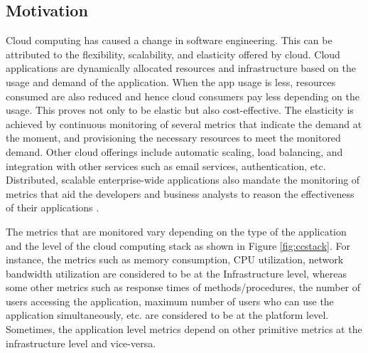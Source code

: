 \documentclass[article,type=msc,colorback,12pt,accentcolor=tud8b,table]{tudthesis}
\begin{document}
	
	\subsection{Motivation}
	
	Cloud computing has caused a change in software engineering. This can be attributed to the flexibility, scalability, and elasticity offered by cloud. Cloud applications are dynamically allocated resources and infrastructure based on the usage and demand of the application. When the app usage is less, resources consumed are also reduced and hence cloud consumers pay less depending on the usage. This proves not only to be elastic but also cost-effective. The elasticity is achieved by continuous monitoring of several metrics that indicate the demand at the moment, and provisioning the necessary resources to meet the monitored demand. Other cloud offerings include automatic scaling, load balancing, and integration with other services such as email services, authentication, etc. Distributed, scalable enterprise-wide applications also mandate the monitoring of metrics that aid the developers and business analysts to reason the effectiveness of their applications \cite{leitner2012application}.
	
	\par The metrics that are monitored vary depending on the type of the application and the level of the cloud computing stack as shown in Figure \ref{fig:ccstack}. For instance, the metrics such as memory consumption, CPU utilization, network bandwidth utilization are considered to be at the Infrastructure level, whereas some other metrics such as response times of methods/procedures, the number of users accessing the application, maximum number of users who can use the application simultaneously, etc. are considered to be at the platform level. Sometimes, the application level metrics depend on other primitive metrics at the infrastructure level and vice-versa.
	
\end{document}
